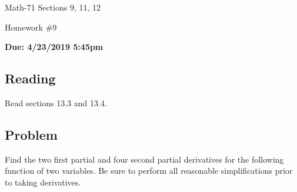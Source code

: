 \documentclass[letterpaper,12pt,fleqn]{article}
\begin{document}
\begin{center}
  \large
  Math-71 Sections 9, 11, 12

  \Large
  Homework \#9

  \large
  \textbf{Due: 4/23/2019 5:45pm}
\end{center}

\subsection*{Reading}

Read sections 13.3 and 13.4.

\subsection*{Problem}

Find the two first partial and four second partial derivatives for the following function of two variables.  Be sure to
perform all reasonable simplifications prior to taking derivatives.

\bigskip

\begin{quote}
  \scalebox{1.5}{\(\displaystyle f(x,y)=\ln\left[x^2e^{(x^3+1)y^2}\right]\)}
\end{quote}
\end{document}
